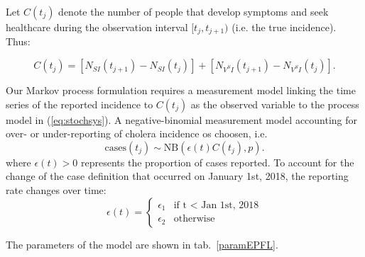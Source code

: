 Let \(C(t_j)\) denote the number of people that develop symptoms and seek healthcare during the
observation interval \([t_j, t_{j+1})\) (i.e. the true incidence). Thus:

\begin{equation}
    C(t_j) = [N_{SI}(t_{j+1}) - N_{SI}(t_j)] + [N_{V^SI}(t_{j+1}) - N_{V^SI}(t_j)].
\end{equation}

Our Markov process formulation requires a measurement model linking the time series of the reported incidence to \(C(t_j)\) as the observed variable to the process model in (\eqref{eq:stochsys}). A negative-binomial measurement model accounting for over- or under-reporting of cholera incidence os choosen, i.e.
\[
	\text{cases}(t_j) \sim \text{NB}(\epsilon(t) C(t_j), p).
\]
where \(\epsilon(t) > 0\) represents the proportion of cases reported. To account for the change of the case definition that occurred on January 1st, 2018, the reporting rate changes over time:
\begin{equation}
\epsilon(t) = \left\{
    \begin{array}{ll}
        \epsilon_1 & \mbox{if t $<$ Jan 1st, 2018} \\
        \epsilon_2 & \mbox{otherwise}
    \end{array}
\right.
\end{equation}

The parameters of the model are shown in tab.~\ref{paramEPFL}.




